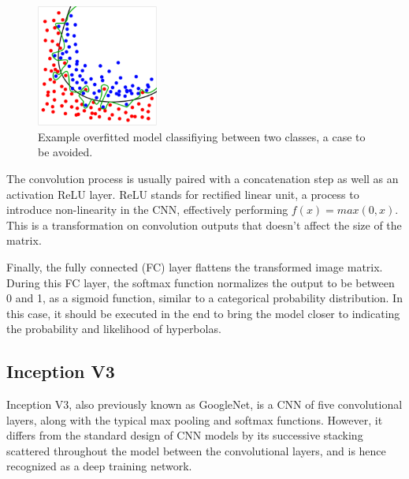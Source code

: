 \documentclass[se,blockletter]{uw-wkrpt}
\begin{document}
\begin{figure}
  \centering
  \includegraphics[height=4cm]{overfitting}
  \caption{Example overfitted model classifiying between two classes, a case to be avoided.~\cite{ref:}}
  \label{fig:overfitting}
\end{figure}

The convolution process is usually paired with a concatenation step as well as an activation ReLU layer. ReLU stands for rectified linear unit, a process to introduce non-linearity in the CNN, effectively performing $f(x) = max(0, x)$. This is a transformation on convolution outputs that doesn't affect the size of the matrix. 

Finally, the fully connected (FC) layer flattens the transformed image matrix. During this FC layer, the softmax function normalizes the output to be between 0 and 1, as a sigmoid function, similar to a categorical probability distribution. In this case, it should be executed in the end to bring the model closer to indicating the probability and likelihood of hyperbolas. 

\subsection{Inception V3}

Inception V3, also previously known as GoogleNet, is a CNN of five convolutional layers, along with the typical max pooling and softmax functions. However, it differs from the standard design of CNN models by its successive stacking scattered throughout the model between the convolutional layers, and is hence recognized as a deep training network.
\end{document}
